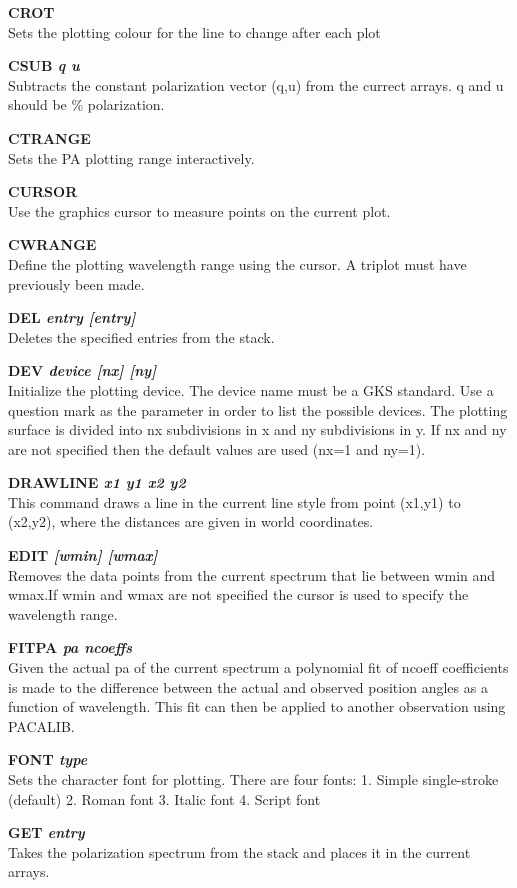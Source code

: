 {\bf CROT} \\
Sets the plotting colour for the line to change after each plot

{\bf CSUB \it q u} \\
Subtracts the constant polarization vector (q,u) from the currect
arrays. q and u should be \% polarization.

{\bf CTRANGE} \\
Sets the PA plotting range interactively.

{\bf CURSOR} \\
Use the graphics cursor to measure points on the current plot.

{\bf CWRANGE } \\
Define the plotting wavelength range using the cursor. A triplot must
have previously been made.

{\bf DEL \it  entry [entry] } \\
Deletes the specified entries from the stack.

{\bf DEV \it  device [nx] [ny]} \\
Initialize the plotting device. The device name must be a GKS standard. Use a
question mark as the parameter in order to list the possible devices. The
plotting surface is divided into nx subdivisions in x and ny subdivisions in
y. If nx and ny are not specified then the default values are used (nx=1 and
ny=1).

{\bf DRAWLINE \it x1 y1 x2 y2} \\
This command draws a line in the current line style from point (x1,y1)
to (x2,y2), where the distances are given in world coordinates.

{\bf EDIT \it [wmin] [wmax]} \\
Removes the data points from the current spectrum that lie between
wmin and wmax.If wmin and wmax are not specified the cursor is used to
specify the wavelength range.

{\bf FITPA \it pa ncoeffs} \\
Given the actual pa of the current spectrum a polynomial fit of ncoeff
coefficients is made to the difference between the actual and observed
position angles as a function of wavelength. This fit can then be
applied to another observation using PACALIB.

{\bf FONT \it type} \\
Sets the character font for plotting. There are four fonts:
1. Simple single-stroke (default)
2. Roman font
3. Italic font
4. Script font

{\bf GET \it entry } \\
Takes the polarization spectrum from the stack and places it in the current
arrays.

